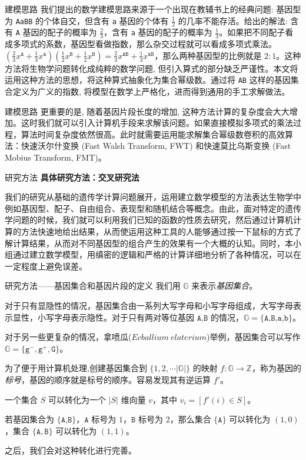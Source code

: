 \documentclass[10pt,aspectratio=43,mathserif]{ctexbeamer}
\begin{document}
	\begin{frame}{建模思路}
		我们提出的数学建模思路来源于一个出现在教辅书上的经典问题: 基因型为 \texttt{AaBB} 的个体自交，但含有 \texttt{a} 基因的个体有 $\frac{1}{2}$ 的几率不能存活。给出的解法: 含有 \texttt{A} 基因的配子的概率为 $\frac{2}{3}$，含有 \texttt{a} 基因的配子的概率为 $\frac{1}{3}$。如果把不同配子看成多项式的系数，基因型看做指数，那么杂交过程就可以看成多项式乘法。$(\frac{2}{3}x^{\texttt{A}}+\frac{1}{3}x^{\texttt{a}})(\frac{1}{2}x^{\texttt{B}}+\frac{1}{2}x^{\texttt{B}})=\frac{2}{3}x^{\texttt{AB}}+\frac{1}{3}x^{\texttt{aB}}$，那么两种基因型的比例就是 $2 : 1$。这种方法将生物学问题转化成纯粹的数学问题, 但引入算式的部分缺乏严谨性。本文将运用这种方法的思想，将这种算式抽象化为集合幂级数。通过将 \texttt{AB} 这样的基因集合定义为广义的指数, 将模型在数学上严格化，进而得到通用的手工求解做法。
	\end{frame}

	\begin{frame}{建模思路}
		更重要的是, 随着基因片段长度的增加, 这种方法计算的复杂度会大大增加。这时我们就可以引入计算机手段来求解该问题。如果直接模拟多项式的乘法过程，算法时间复杂度依然很高。此时就需要运用能求解集合幂级数卷积的高效算法：快速沃尔什变换 (Fast Walsh Transform, FWT) 和快速莫比乌斯变换 (Fast Mobius Transform, FMT)。
	\end{frame}

	\begin{frame}{研究方法}
		\textbf{具体研究方法：交叉研究法}
		
		我们的研究从基础的遗传学计算问题展开，运用建立数学模型的方法表达生物学中例如基因型、配子、自由组合、表现型和随机结合等概念。由此，面对特定的遗传学问题的时候，我们就可以利用我们已知的函数的性质去研究，然后通过计算机计算的方法快速地给出结果，从而使运用这种工具的人能够通过按一下鼠标的方式了解计算结果，从而对不同基因型的组合产生的效果有一个大概的认知。同时，本小组通过建立数学模型，用缜密的逻辑和严格的计算详细地分析了各种情况，可以在一定程度上避免误差。
	\end{frame}

	\begin{frame}{研究方法——基因集合和基因片段的定义}
		我们用 $\mathbb{G}$ 来表示\textsl{基因集合}。
		
		对于只有显隐性的情况，基因集合由一系列大写字母和小写字母组成，大写字母表示显性，小写字母表示隐性。对于只有两对等位基因 $\texttt{A,B}$ 的情况，$\mathbb{G}=\{\texttt{A,B,a,b}\}$。
		
		对于另一些更复杂的情况，拿喷瓜($\mathit{Ecballium\ elaterium}$)举例，基因集合可以写作 $\mathbb{G}=\{\texttt{g}^{-},\texttt{g}^{+},\texttt{G}\}$。
		
		为了便于用计算机处理,创建基因集合到 $\{1,2,\cdots |\mathbb{G}|\}$ 的映射 $f:\mathbb{G} \to \mathbb{Z}$，称为基因的\textsl{标号}，基因的顺序就是标号的顺序。容易发现其有逆运算 $f'$。
		
		一个集合 $S$ 可以转化为一个 $|S|$ 维向量 $v$，其中 $v_i=[f'(i) \in S]$。
		
		若基因集合为 $\{\texttt{A,B}\}$，$\texttt{A}$ 标号为 $1$，$\texttt{B}$ 标号为 $2$，那么集合 $\{\texttt{A}\}$ 可以转化为 $(1,0)$，集合 $\{\texttt{A},\texttt{B}\}$ 可以转化为 $(1,1)$。
		
		之后，我们会对这种转化进行完善。
	\end{frame}
\end{document}
